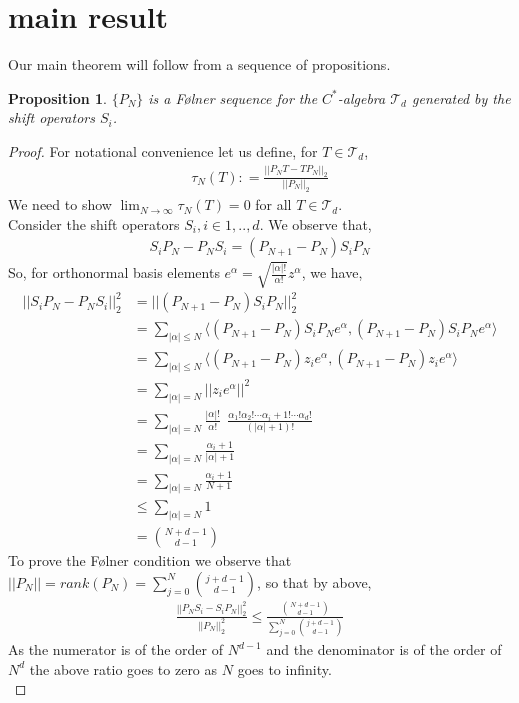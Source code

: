 \documentclass[article]{amsart}
\newtheorem{proposition}        [theorem]{Proposition}
\begin{document}
\section{main result}
Our main theorem will follow from a sequence of propositions.
\begin{proposition}\label{eq17}
    $\{P_N\}$ is a Følner sequence for the $C^*$-algebra $\mathcal{T}_d$ generated by the shift operators $S_i$.
\end{proposition}
\begin{proof}
    For notational convenience let us define, for $T \in \mathcal{T}_d$,
    \begin{align*}
    \tau_N(T) : = \frac{||P_N T - T P_N||_2}{||P_N||_2}
    \end{align*}
    We need to show $\lim_{N \rightarrow \infty} \tau_N(T)=0$ for all $T \in \mathcal{T}_d$. \\
    
    Consider the shift operators $S_i, i \in {1,..,d}$. We observe that,
    \begin{align*}
   S_i P_N - P_N S_i= (P_{N+1} -P_N) S_i P_N
    \end{align*}
    So, for orthonormal basis elements $e^{\alpha} = \sqrt{\frac{|\alpha|!}{\alpha!}} z^{\alpha}$, we have,
    \begin{align*}
    || S_i P_N-P_N S_i||_2^2 & = ||(P_{N+1}-P_N) S_i P_N||_2^2\\
    & = \sum_{|\alpha| \leq N} \langle (P_{N+1} - P_N)S_i P_N e^{\alpha}, (P_{N+1}-P_N)S_i P_N e^{\alpha}\rangle\\
    & = \sum_{|\alpha| \leq N} \langle(P_{N+1}-P_N)z_i e^{\alpha}, (P_{N+1}- P_N) z_i e^{\alpha}\rangle\\
    & = \sum_{|\alpha|=N} ||z_i e^{\alpha}||^2\\
    & = \sum_{|\alpha|=N} \frac{|\alpha|!}{\alpha !} \ \ \frac{\alpha_1! \alpha_2! \cdots \alpha_i+1! \cdots \alpha_d !}{(|\alpha|+1)!} \\
    & = \sum_{|\alpha|=N} \frac{\alpha_i+1}{|\alpha|+1}\\
    & = \sum_{|\alpha|=N} \frac{\alpha_i+1}{N+1}\\
    & \leq \sum_{|\alpha|=N} 1\\
    & = \binom{N+d-1}{d-1}
    \end{align*}
    To prove the Følner condition we observe that $||P_N|| = rank(P_N) = {\sum_{j=0}^N \binom{j+d-1}{d-1}}$, so that by above,
    \begin{align*}
    \frac{||P_N S_i - S_i P_N||_2^2}{||P_N||_2^2} \leq \frac{ \binom{N+d-1}{d-1}}{\sum_{j=0}^N \binom{j+d-1}{d-1}}
    \end{align*}
    As the numerator is of the order of $N^{d-1}$ and the denominator is of the order of $N^{d}$ the above ratio goes to zero as $N$ goes to infinity.\\


\end{proof}
\end{document}
